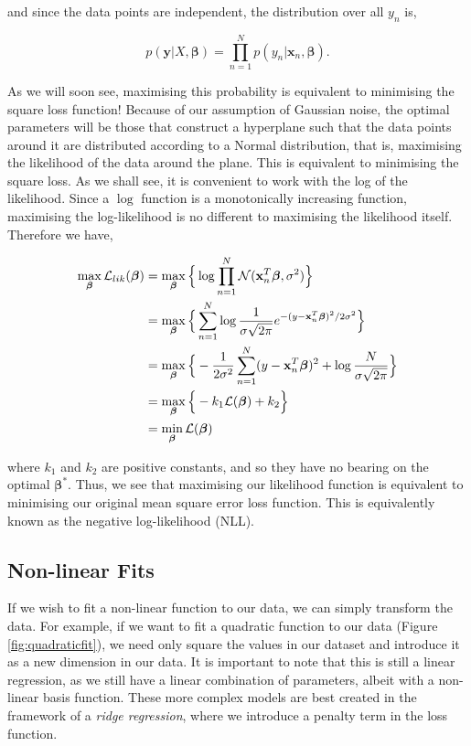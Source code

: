 \documentclass[11pt]{amsart}
\begin{document}
and since the data points are independent, the distribution over all $y_n$ is,

$$p(\mathbf{y}|X, \boldsymbol\beta) = \prod_{n=1}^N p(y_n|\mathbf{x}_n, \boldsymbol\beta).$$

As we will soon see, maximising this probability is equivalent to minimising the square loss function! Because of our assumption of Gaussian noise, the optimal parameters will be those that construct a hyperplane such that the data points around it are distributed according to a Normal distribution, that is, maximising the likelihood of the data around the plane. This is equivalent to minimising the square loss. As we shall see, it is convenient to work with the log of the likelihood. Since a $\log$ function is a monotonically increasing function, maximising the log-likelihood is no different to maximising the likelihood itself. Therefore we have,

\begin{align}
\max_{\boldsymbol\beta}\mathcal{L}_{lik}(\boldsymbol\beta) &= \max_{\boldsymbol\beta}\Big\{\log \prod_{n=1}^N \mathcal{N}(\mathbf{x}_n^T\boldsymbol\beta, \sigma^2)\Big\} \notag \\
&=\max_{\boldsymbol\beta}\Big\{\sum_{n=1}^N \log \frac{1}{\sigma\sqrt{2\pi}}e^{-(y - \mathbf{x}_n^T\boldsymbol\beta)^2/2\sigma^2}\Big\} \notag \\
&=\max_{\boldsymbol\beta}\Big\{-\frac{1}{2\sigma^2}\sum_{n=1}^N (y - \mathbf{x}_n^T\boldsymbol\beta)^2 + \log\frac{N}{\sigma\sqrt{2\pi}}\Big\} \notag \\
&=\max_{\boldsymbol\beta}\Big\{-k_1\mathcal{L}(\boldsymbol\beta) + k_2\Big\} \notag \\
&=\min_{\boldsymbol\beta}\mathcal{L}(\boldsymbol\beta)\notag
\end{align}

where $k_1$ and $k_2$ are positive constants, and so they have no bearing on the optimal $\boldsymbol\beta^*$. Thus, we see that maximising our likelihood function is equivalent to minimising our original mean square error loss function. This is equivalently known as the negative log-likelihood (NLL).

\subsection{Non-linear Fits}

If we wish to fit a non-linear function to our data, we can simply transform the data. For example, if we want to fit a quadratic function to our data (Figure \ref{fig:quadraticfit}), we need only square the values in our dataset and introduce it as a new dimension in our data. It is important to note that this is still a linear regression, as we still have a linear combination of parameters, albeit with a non-linear basis function. These more complex models are best created in the framework of a \emph{ridge regression}, where we introduce a penalty term in the loss function.
\end{document}
